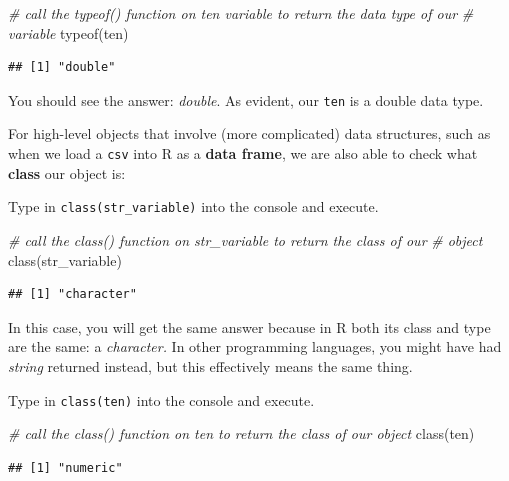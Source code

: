 \documentclass[
]{book}
\newenvironment{Shaded}{\begin{snugshade}}{\end{snugshade}}
\newcommand{\CommentTok}[1]{\textcolor[rgb]{0.56,0.35,0.01}{\textit{#1}}}
\newcommand{\FunctionTok}[1]{\textcolor[rgb]{0.00,0.00,0.00}{#1}}
\newcommand{\NormalTok}[1]{#1}
\begin{document}
\begin{Shaded}
\begin{Highlighting}[]
\CommentTok{\# call the typeof() function on ten variable to return the data type of our}
\CommentTok{\# variable}
\FunctionTok{typeof}\NormalTok{(ten)}
\end{Highlighting}
\end{Shaded}

\begin{verbatim}
## [1] "double"
\end{verbatim}

You should see the answer: \emph{double}. As evident, our \texttt{ten} is a double data type.

For high-level objects that involve (more complicated) data structures, such as when we load a \texttt{csv} into R as a \textbf{data frame}, we are also able to check what \textbf{class} our object is:

Type in \texttt{class(str\_variable)} into the console and execute.

\begin{Shaded}
\begin{Highlighting}[]
\CommentTok{\# call the class() function on str\_variable to return the class of our}
\CommentTok{\# object}
\FunctionTok{class}\NormalTok{(str\_variable)}
\end{Highlighting}
\end{Shaded}

\begin{verbatim}
## [1] "character"
\end{verbatim}

In this case, you will get the same answer because in R both its class and type are the same: a \emph{character.} In other programming languages, you might have had \emph{string} returned instead, but this effectively means the same thing.

Type in \texttt{class(ten)} into the console and execute.

\begin{Shaded}
\begin{Highlighting}[]
\CommentTok{\# call the class() function on ten to return the class of our object}
\FunctionTok{class}\NormalTok{(ten)}
\end{Highlighting}
\end{Shaded}

\begin{verbatim}
## [1] "numeric"
\end{verbatim}
\end{document}
